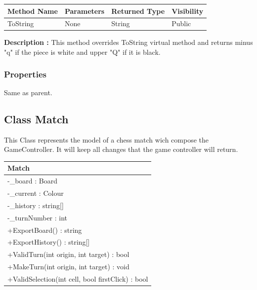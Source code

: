 \documentclass[12pt]{article}
\begin{document}
\begin{table}[H]
    \begin{tabular}{|l|l|l|l|}
    \hline
    \rowcolor[HTML]{EFEFEF} 
    \cellcolor[HTML]{EFEFEF}\textbf{Method Name} & \textbf{Parameters}  & \textbf{Returned Type} & \textbf{Visibility} \\ \hline
    ToString                                   & None                 & String                   & Public              \\ \hline
    \end{tabular}
\end{table}

\textbf{Description :} This method overrides ToString virtual
method and returns minus "q" if the piece is white and upper "Q"
if it is black.

\subsubsection{Properties}

Same as parent.

\newpage


\subsection{Class Match}

This Class represents the model of a chess match wich compose the
GameController. It will keep all changes that the game controller will return.

\begin{table}[H]
    \begin{tabular}{|l|}
    \hline
    \rowcolor[HTML]{C0C0C0} 
    \textbf{Match}                                    \\ \hline
    \rowcolor[HTML]{EFEFEF} 
    -\_board : Board                                  \\ \hline
    \rowcolor[HTML]{EFEFEF} 
    -\_current : Colour                               \\ \hline
    \rowcolor[HTML]{EFEFEF} 
    -\_history : string{[}{]}                         \\ \hline
    \rowcolor[HTML]{EFEFEF} 
    -\_turnNumber : int                               \\ \hline
    +ExportBoard() : string                           \\ \hline
    +ExportHistory() : string[]                       \\ \hline
    +ValidTurn(int origin, int target) : bool         \\ \hline
    +MakeTurn(int origin, int target) : void          \\ \hline
    +ValidSelection(int cell, bool firstClick) : bool \\ \hline
    \end{tabular}
\end{table}
\end{document}
